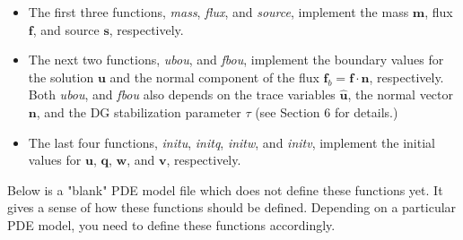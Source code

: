 \documentclass[11pt]{article}
\begin{document}
\begin{itemize}
\item The first three functions,  {\em mass},  {\em flux}, and  {\em source},  implement the mass $\bm m$, flux $\bm f$, and source $\bm s$, respectively. 

\item The next two functions,  {\em ubou}, and {\em fbou}, implement the boundary values for the solution $\bm u$ and the normal component of the flux $\bm f_b = \bm f \cdot \bm n$, respectively. Both  {\em ubou}, and {\em fbou} also depends on the trace variables $\widehat{\bm{u}}$, the normal vector $\bm n$, and the DG stabilization parameter $\tau$ (see Section 6 for details.) 

\item The last four functions, {\em initu}, {\em initq}, {\em initw}, and {\em initv}, implement the initial values for $\bm u$, $\bm q$, $\bm w$, and $\bm v$, respectively. 
\end{itemize}

Below is a "blank" PDE model file which does not define these functions yet. It gives a sense of how these functions should be defined. Depending on a particular PDE model, you need to define these functions accordingly. 
\end{document}
